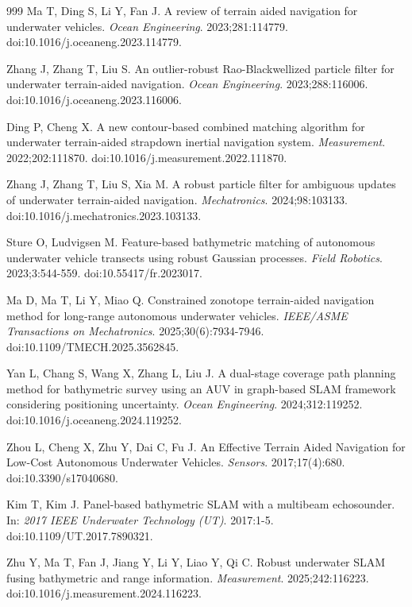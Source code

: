 \documentclass[jmse,article,submit,moreauthors]{Definitions/mdpi}
\begin{document}
\begin{thebibliography}{999}
Ma T, Ding S, Li Y, Fan J. A review of terrain aided navigation for underwater vehicles. \textit{Ocean Engineering}. 2023;281:114779. doi:10.1016/j.oceaneng.2023.114779.

Zhang J, Zhang T, Liu S. An outlier-robust Rao-Blackwellized particle filter for underwater terrain-aided navigation. \textit{Ocean Engineering}. 2023;288:116006. doi:10.1016/j.oceaneng.2023.116006.

Ding P, Cheng X. A new contour-based combined matching algorithm for underwater terrain-aided strapdown inertial navigation system. \textit{Measurement}. 2022;202:111870. doi:10.1016/j.measurement.2022.111870.

Zhang J, Zhang T, Liu S, Xia M. A robust particle filter for ambiguous updates of underwater terrain-aided navigation. \textit{Mechatronics}. 2024;98:103133. doi:10.1016/j.mechatronics.2023.103133.

Sture O, Ludvigsen M. Feature-based bathymetric matching of autonomous underwater vehicle transects using robust Gaussian processes. \textit{Field Robotics}. 2023;3:544-559. doi:10.55417/fr.2023017.

Ma D, Ma T, Li Y, Miao Q. Constrained zonotope terrain-aided navigation method for long-range autonomous underwater vehicles. \textit{IEEE/ASME Transactions on Mechatronics}. 2025;30(6):7934-7946. doi:10.1109/TMECH.2025.3562845.

Yan L, Chang S, Wang X, Zhang L, Liu J. A dual-stage coverage path planning method for bathymetric survey using an AUV in graph-based SLAM framework considering positioning uncertainty. \textit{Ocean Engineering}. 2024;312:119252. doi:10.1016/j.oceaneng.2024.119252.

Zhou L, Cheng X, Zhu Y, Dai C, Fu J. An Effective Terrain Aided Navigation for Low-Cost Autonomous Underwater Vehicles. \textit{Sensors}. 2017;17(4):680. doi:10.3390/s17040680.

Kim T, Kim J. Panel-based bathymetric SLAM with a multibeam echosounder. In: \textit{2017 IEEE Underwater Technology (UT)}. 2017:1-5. doi:10.1109/UT.2017.7890321.

Zhu Y, Ma T, Fan J, Jiang Y, Li Y, Liao Y, Qi C. Robust underwater SLAM fusing bathymetric and range information. \textit{Measurement}. 2025;242:116223. doi:10.1016/j.measurement.2024.116223.


\end{thebibliography}
\end{document}
